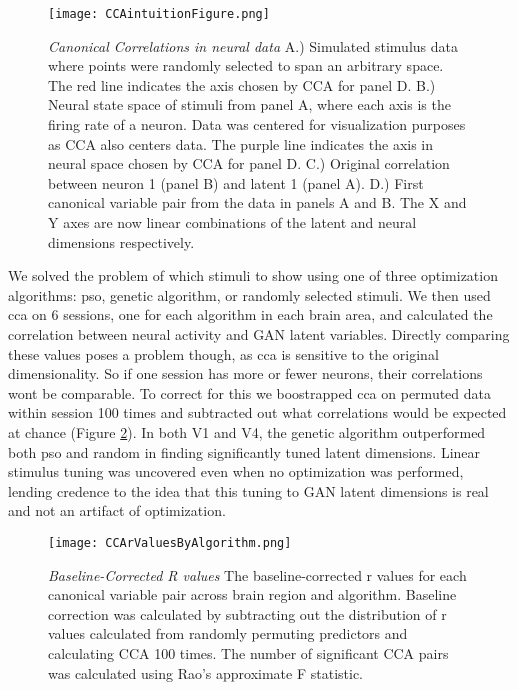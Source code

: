 \begin{figure}
	\centering
	\texttt{[image: CCAintuitionFigure.png]}
	{\caption{{\it Canonical Correlations in neural data} A.) Simulated stimulus data where points were randomly selected to span an arbitrary space. The red line indicates the axis chosen by CCA for panel D. B.) Neural state space of stimuli from panel A, where each axis is the firing rate of a neuron. Data was centered for visualization purposes as CCA also centers data. The purple line indicates the axis in neural space chosen by CCA for panel D. C.) Original correlation between neuron 1 (panel B) and latent 1 (panel A). D.) First canonical variable pair from the data in panels A and B. The X and Y axes are now linear combinations of the latent and neural dimensions respectively. }
	\label{fig:ccaIntuition}}
\end{figure}

We solved the problem of which stimuli to show using one of three optimization algorithms: \gls{pso}, genetic algorithm, or randomly selected stimuli. We then used \gls{cca} on 6 sessions, one for each algorithm in each brain area, and calculated the correlation between neural activity and GAN latent variables. Directly comparing these values poses a problem though, as \gls{cca} is sensitive to the original dimensionality. So if one session has more or fewer neurons, their correlations wont be comparable. To correct for this we boostrapped \gls{cca} on permuted data within session 100 times and subtracted out what correlations would be expected at chance (Figure \ref{fig:ccaR}). In both V1 and V4, the genetic algorithm outperformed both \gls{pso} and random in finding significantly tuned latent dimensions. Linear stimulus tuning was uncovered even when no optimization was performed, lending credence to the idea that this tuning to GAN latent dimensions is real and not an artifact of optimization.

\begin{figure}
	\centering
	\texttt{[image: CCArValuesByAlgorithm.png]}
	{\caption{{\it Baseline-Corrected R values} The baseline-corrected r values for each canonical variable pair across brain region and algorithm. Baseline correction was calculated by subtracting out the distribution of r values calculated from randomly permuting predictors and calculating CCA 100 times. The number of significant CCA pairs was calculated using Rao's approximate F statistic.}
	\label{fig:ccaR}}
\end{figure}

